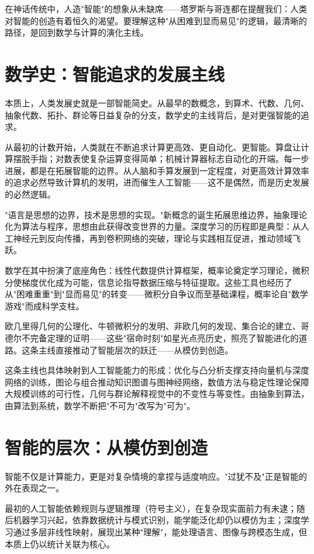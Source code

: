 在神话传统中，人造"智能"的想象从未缺席——塔罗斯与哥连都在提醒我们：人类对智能的创造有着恒久的渴望。要理解这种"从困难到显而易见"的逻辑，最清晰的路径，是回到数学与计算的演化主线。

\section{数学史：智能追求的发展主线}

本质上，人类发展史就是一部智能简史。从最早的数概念，到算术、代数、几何、抽象代数、拓扑、群论等日益复杂的分支，数学史的主线背后，是对更强智能的追求。

从最初的计数开始，人类就在不断追求计算更高效、更自动化、更智能。算盘让计算摆脱手指；对数表使复杂运算变得简单；机械计算器标志自动化的开端。每一步进展，都是在拓展智能的边界。从人脑和手算发展到一定程度，对更高效计算效率的追求必然导致计算机的发明，进而催生人工智能——这不是偶然，而是历史发展的必然逻辑。

"语言是思想的边界，技术是思想的实现。"新概念的诞生拓展思维边界，抽象理论化为算法与程序，思想由此获得改变世界的力量。深度学习的历程即是典型：从人工神经元到反向传播，再到卷积网络的突破，理论与实践相互促进，推动领域飞跃。

数学在其中扮演了底座角色：线性代数提供计算框架，概率论奠定学习理论，微积分使梯度优化成为可能，信息论指导数据压缩与特征提取。这些工具也经历了从"困难重重"到"显而易见"的转变——微积分自争议而至基础课程，概率论自"数学游戏"而成科学支柱。

欧几里得几何的公理化、牛顿微积分的发明、非欧几何的发现、集合论的建立、哥德尔不完备定理的证明——这些"宿命时刻"如星光点亮历史，照亮了智能进化的道路。这条主线直接推动了智能层次的跃迁——从模仿到创造。

这条主线也具体映射到人工智能能力的形成：优化与凸分析支撑支持向量机与深度网络的训练，图论与组合推动知识图谱与图神经网络，数值方法与稳定性理论保障大规模训练的可行性，几何与群论解释视觉中的不变性与等变性。由抽象到算法，由算法到系统，数学不断把"不可为"改写为"可为"。

\section{智能的层次：从模仿到创造}

智能不仅是计算能力，更是对复杂情境的拿捏与适度响应。"过犹不及"正是智能的外在表现之一。

最初的人工智能依赖规则与逻辑推理（符号主义），在复杂现实面前力有未逮；随后机器学习兴起，依靠数据统计与模式识别，能学能泛化却仍以模仿为主；深度学习通过多层非线性映射，展现出某种"理解"，能处理语言、图像与跨模态生成，但本质上仍以统计关联为核心。

